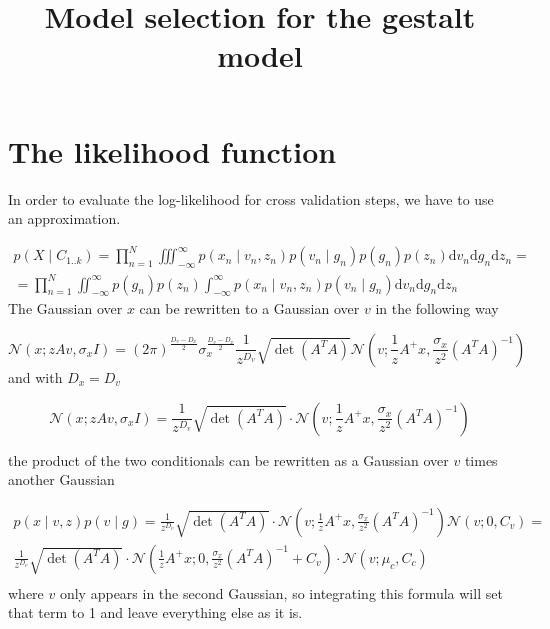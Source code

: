 \documentclass{paper}
\begin{document}
\title{Model selection for the gestalt model}
\maketitle

\section{The likelihood function}

In order to evaluate the log-likelihood for cross validation steps, we have to use an approximation.

\begin{equation}
\begin{split}
p(X \mid C_{1..k}) = \prod_{n=1}^N \iiint_{-\infty}^{\infty} p(x_n \mid v_n,z_n) p(v_n \mid g_n) p(g_n) p(z_n) \mathrm{d}v_n\mathrm{d}g_n\mathrm{d}z_n = \\
= \prod_{n=1}^N \iint_{-\infty}^{\infty}  p(g_n) p(z_n) \int_{-\infty}^{\infty} p(x_n \mid v_n,z_n) p(v_n \mid g_n) \mathrm{d}v_n\mathrm{d}g_n \mathrm{d}z_n
\end{split}
\end{equation}
%
The Gaussian over $x$ can be rewritten to a Gaussian over $v$  in the following way

\begin{equation} 
\mathcal{N}(x;zAv,\sigma_x I) = (2 \pi)^{\frac{D_v-D_x}{2}} \sigma_x^{\frac{D_v-D_x}{2}} \frac{1}{z^{D_v}} \sqrt{\det(A^T A)}  \mathcal{N}(v; \frac{1}{z}A^{+} x, \frac{\sigma_x}{z^2} (A^T A)^{-1})
\end{equation}
%
and with $D_x = D_v$

\begin{equation} 
\mathcal{N}(x;zAv,\sigma_x I) = \frac{1}{z^{D_v}} \sqrt{\det(A^T A)}  \cdot \mathcal{N}(v; \frac{1}{z}A^{+} x, \frac{\sigma_x}{z^2} (A^T A)^{-1})
\end{equation}

the product of the two conditionals can be rewritten as a Gaussian over $v$ times another Gaussian

\begin{equation} \label{eq:gaussprod}
\begin{split}
p(x \mid v,z) p(v \mid g) =  \frac{1}{z^{D_v}} \sqrt{\det(A^T A)}  \cdot \mathcal{N}(v; \frac{1}{z}A^{+} x, \frac{\sigma_x}{z^2} (A^T A)^{-1}) \mathcal{N}(v;0,C_v) = \\
 \frac{1}{z^{D_v}} \sqrt{\det(A^T A)}  \cdot \mathcal{N}(\frac{1}{z} A^{+}x; 0,\frac{\sigma_x}{z^2} (A^T A)^{-1} +C_v) \cdot \mathcal{N}(v; \mu_c,C_c) \\
\end{split}
\end{equation}
%
where $v$ only appears in the second Gaussian, so integrating this formula will set that term to 1 and leave everything else as it is.
\end{document}

